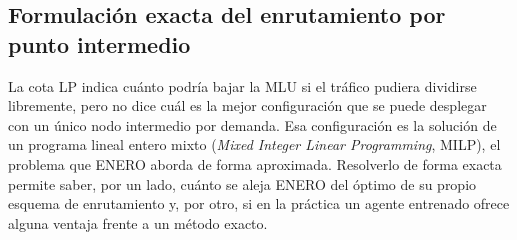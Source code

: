 \subsection{Formulación exacta del enrutamiento por punto intermedio}\label{sec:milp}

La cota LP indica cuánto podría bajar la MLU si el tráfico pudiera dividirse libremente, pero no dice cuál es la mejor configuración que se puede desplegar con un único nodo intermedio por demanda. Esa configuración es la solución de un programa lineal entero mixto (\textit{Mixed Integer Linear Programming}, MILP), el problema que ENERO aborda de forma aproximada. Resolverlo de forma exacta permite saber, por un lado, cuánto se aleja ENERO del óptimo de su propio esquema de enrutamiento y, por otro, si en la práctica un agente entrenado ofrece alguna ventaja frente a un método exacto.

